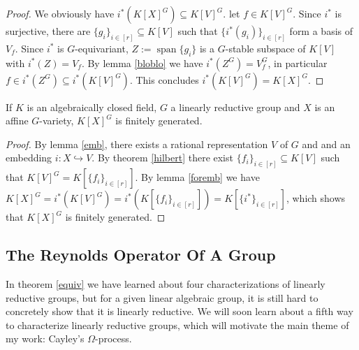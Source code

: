 \begin{proof}
  We obviously have $i^\ast(K[X]^G) \subseteq K[V]^G$.
  let $f \in K[V]^G$.
  Since $i^\ast$ is surjective, there are $ \{g_i\}_{i \in [r]} \subseteq K[V]$ such that $\{i^\ast(g_i)\}_{i \in [r]}$ form a basis of $V_f$.
  Since $i^\ast$ is $G$-equivariant, $Z := \operatorname{span}\{g_i\}$ is a $G$-stable subspace of $K[V]$ with $i^\ast(Z) = V_f$.
  By lemma \ref{bloblo} we have $i^\ast (Z^G) = V_f^G$, in particular $f \in i^\ast (Z^G) \subseteq i^\ast(K[V]^G)$.
  This concludes $i^\ast(K[V]^G) = K[X]^G$.
\end{proof}

\begin{theorem}
  If $K$ is an algebraically closed field, $G$ a linearly reductive group and $X$ is an affine $G$-variety, $K[X]^G$ is finitely generated.
\end{theorem}

\begin{proof}
  By lemma \ref{emb}, there exists a rational representation $V$ of $G$ and and an embedding $i \colon X \hookrightarrow V$.
  By theorem \ref{hilbert} there exist $ \{f_i\}_{i \in [r]} \subseteq K[V]$ such that $K[V]^G = K[\{f_i\}_{i \in [r]}]$.
  By lemma \ref{foremb} we have $K[X]^G = i^\ast (K[V]^G) = i^\ast (K[\{f_i\}_{i \in [r]}]) = K[\{i^\ast\}_{i \in [r]}]$, which shows that $K[X]^G$ is finitely generated.
\end{proof}

\subsection{The Reynolds Operator Of A Group}



In theorem \ref{equiv} we have learned about four characterizations of linearly reductive groups, but for a given linear algebraic group, it is still hard to concretely show that it is linearly reductive.
We will soon learn about a fifth way to characterize linearly reductive groups, which will motivate the main theme of my work:  Cayley's $\Omega$-process.

